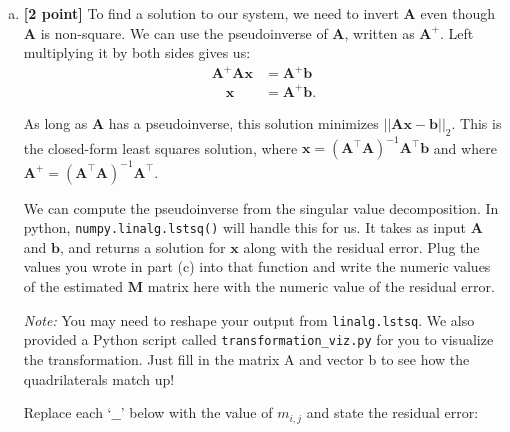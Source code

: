 \begin{enumerate}[(a)]
\pagebreak
\item \textbf{[2 point]} To find a solution to our system, we need to invert $\bm{A}$ even though $\bm{A}$ is non-square. We can use the pseudoinverse of $\bm{A}$, written as $\bm{A}^+$. Left multiplying it by both sides gives us:
\begin{align*}
 \bm{A}^+ \bm{A}\bm{x} &= \bm{A}^+ \bm{b}\\
 \quad \bm{x} &= \bm{A}^+ \bm{b}.
\end{align*}

As long as $\bm{A}$ has a pseudoinverse, this solution minimizes $||\bm{A}\bm{x} - \bm{b}||_2$. This is the closed-form least squares solution, where $\bm{x} = (\bm{A}^\top \bm{A})^{-1}\bm{A}^\top\bm{b}$ and where $\bm{A}^+ = (\bm{A}^\top \bm{A})^{-1}\bm{A}^\top$.

We can compute the pseudoinverse from the singular value decomposition. In python, \texttt{numpy.linalg.lstsq()} will handle this for us. It takes as input $\bm{A}$ and $\bm{b}$, and returns a solution for $\bm{x}$ along with the residual error. Plug the values you wrote in part (c) into that function and write the numeric values of the estimated $\bm{M}$ matrix here with the numeric value of the residual error.

\textit{Note:} You may need to reshape your output from \texttt{linalg.lstsq}. We also provided a Python script called \texttt{transformation\_viz.py} for you to visualize the transformation. Just fill in the matrix A and vector b to see how the quadrilaterals match up!

\begin{tcolorbox}[colback=orange!5!white,colframe=orange!75!black]
Replace each `$\_\_$' below with the value of $m_{i, j}$ and state the residual error:
\end{tcolorbox}

\end{enumerate}
